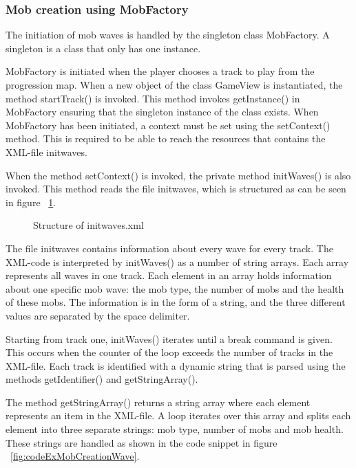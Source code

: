 \subsubsection{Mob creation using MobFactory}

The initiation of mob waves is handled by the singleton class MobFactory. A singleton is a class that only has one instance. \citep{designPatterns}

MobFactory is initiated when the player chooses a track to play from the progression map. When a new object of the class GameView is instantiated, the method startTrack() is invoked. This method invokes getInstance() in MobFactory ensuring that the singleton instance of the class exists. When MobFactory has been initiated, a context must be set using the setContext() method. This is required to be able to reach the resources that contains the XML-file initwaves.

When the method setContext() is invoked, the private method initWaves() is also invoked. This method reads the file initwaves, which is structured as can be seen in figure ~\ref{fig:codeExInitWavesXML}.


\begin{figure}[htb]

\begin{small}

\end{small}

\caption{Structure of initwaves.xml}
\label{fig:codeExInitWavesXML}

\end{figure}

The file initwaves contains information about every wave for every track. The XML-code is interpreted by initWaves() as a number of string arrays. Each array represents all waves in one track. Each element in an array holds information about one specific mob wave: the mob type, the number of mobs and the health of these mobs. The information is in the form of a string, and the three different values are separated by the space delimiter.

Starting from track one, initWaves() iterates until a break command is given. This occurs when the counter of the loop exceeds the number of tracks in the XML-file. Each track is identified with a dynamic string that is parsed using the methods getIdentifier() and getStringArray().

The method getStringArray() returns a string array where each element represents an item in the XML-file. A loop iterates over this array and splits each element into three separate strings: mob type, number of mobs and mob health. These strings are handled as shown in the code snippet in figure ~\ref{fig:codeExMobCreationWave}.

